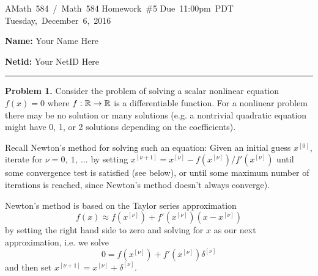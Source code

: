 \documentclass[10pt]{article}
\begin{document}
\hfill \vbox{
\hbox{AMath 584 / Math 584}
\hbox{Homework \#5}
\hbox{Due 11:00pm PDT}
\hbox{Tuesday, December 6, 2016}
}


\vskip 0.5cm

{\bf Name:}   Your Name Here

{\bf Netid:}  Your NetID Here

\vskip 0.5cm

\vskip 1cm
\hrule
{\bf Problem 1.}
Consider the problem of solving a scalar nonlinear equation $f(x)=0$ where $f:
\mathbb{R} \rightarrow \mathbb{R}$ is a differentiable function. For a
nonlinear problem there may be no solution or many solutions (e.g. a nontrivial 
quadratic equation might have 0, 1, or 2 solutions depending on the coefficients).

\newcommand{\x}[1]{x^{[#1]}}
Recall Newton's method for solving such an equation: Given an initial guess 
$\x0$, iterate for $\nu = 0,~1,~\ldots$ by setting $\x{\nu+1} = \x\nu -
f(\x\nu)/f'(\x\nu)$ until some convergence test is satisfied (see below),
or until some maximum number of iterations is reached, since Newton's
method doesn't always converge).

Newton's method is based on the Taylor series approximation
\begin{equation}\label{newton1}
f(x) \approx f(\x\nu) + f'(\x\nu)(x-\x\nu)
\end{equation} 
by setting the right hand side to zero and solving for $x$ as our next
approximation, i.e. we solve
\begin{equation}\label{newton2}
0 = f(\x\nu) + f'(\x\nu)\delta^{[\nu]}
\end{equation} 
and then set $\x{\nu+1} = \x\nu + \delta^{[\nu]}$.
\end{document}
